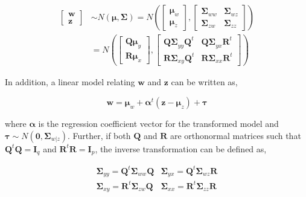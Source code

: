 \documentclass[3p,times,12pt,authoryear]{elsarticle}
\theoremstyle{definition}
\theoremstyle{definition}
\theoremstyle{remark}
\begin{document}
\begin{align}
  \begin{bmatrix}\mathbf{w} \\ 
  \mathbf{z}\end{bmatrix}  & \sim N \left(\boldsymbol{\mu}, \boldsymbol{\Sigma}\right)
  = N \left(
    \begin{bmatrix}
      \boldsymbol{\mu}_w \\ \boldsymbol{\mu}_z
    \end{bmatrix},
    \begin{bmatrix}
      \boldsymbol{\Sigma}_{ww} & \boldsymbol{\Sigma}_{wz} \\
      \boldsymbol{\Sigma}_{zw} & \boldsymbol{\Sigma}_{zz}
    \end{bmatrix} \right) \nonumber \\
  &= N \left(
    \begin{bmatrix}
      \boldsymbol{Q\mu}_y \\
      \boldsymbol{R\mu}_x
    \end{bmatrix},
    \begin{bmatrix}
      \boldsymbol{Q\Sigma}_{yy}\boldsymbol{Q}^t & \boldsymbol{Q\Sigma}_{yx}\mathbf{R}^t \\
      \boldsymbol{R\Sigma}_{xy}\boldsymbol{Q}^t & \boldsymbol{R\Sigma}_{xx}\mathbf{R}^t
    \end{bmatrix}
  \right)
  \label{eq:model3}
\end{align}

In addition, a linear model relating \(\mathbf{w}\) and \(\mathbf{z}\)
can be written as,

\begin{equation}
\mathbf{w} =    \boldsymbol{\mu}_w + \boldsymbol{\alpha}^t \left(\mathbf{z} - \boldsymbol{\mu}_z\right) + \boldsymbol{\tau}
\label{eq:latent-model}
\end{equation}

where \(\boldsymbol{\alpha}\) is the regression coefficient vector for
the transformed model and
\(\boldsymbol{\tau} \sim N\left(\mathbf{0}, \boldsymbol{\Sigma}_{w|z}\right)\).
Further, if both \(\mathbf{Q}\) and \(\mathbf{R}\) are orthonormal
matrices such that \(\mathbf{Q}^t\mathbf{Q} = \mathbf{I}_q\) and
\(\mathbf{R}^t\mathbf{R} = \mathbf{I}_p\), the inverse transformation
can be defined as,

\begin{equation}
  \begin{matrix}
    \boldsymbol{\Sigma}_{yy} = \mathbf{Q}^t \boldsymbol{\Sigma}_{ww} \mathbf{Q} &
    \boldsymbol{\Sigma}_{yx} = \mathbf{Q}^t \boldsymbol{\Sigma}_{wz} \mathbf{R} \\
    \boldsymbol{\Sigma}_{xy} = \mathbf{R}^t \boldsymbol{\Sigma}_{zw} \mathbf{Q} &
    \boldsymbol{\Sigma}_{xx} = \mathbf{R}^t \boldsymbol{\Sigma}_{zz} \mathbf{R}
  \end{matrix}
  \label{eq:cov-yx-wz}
\end{equation}
\end{document}
